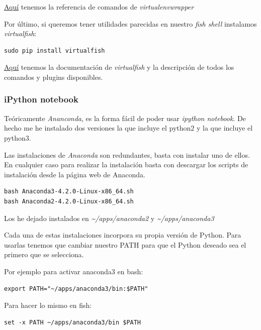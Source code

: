 \documentclass[12pt,spanish,]{scrartcl}
\begin{document}
\href{http://virtualenvwrapper.readthedocs.io/en/latest/command_ref.html}{Aquí}
tenemos la referencia de comandos de \emph{virtualenvwrapper}

Por último, si queremos tener utilidades parecidas en nuestro \emph{fish
shell} instalamos \emph{virtualfish}:

\begin{verbatim}
sudo pip install virtualfish
\end{verbatim}

\href{http://virtualfish.readthedocs.io/en/latest/index.html}{Aquí}
tenemos la documentación de \emph{virtualfish} y la descripción de todos
los comandos y plugins disponibles.

\subsubsection{iPython notebook}\label{ipython-notebook}

Teóricamente \emph{Ananconda}, es la forma fácil de poder usar
\emph{ipython notebook}. De hecho me he instalado dos versiones la que
incluye el python2 y la que incluye el python3.

Las instalaciones de \emph{Anaconda} son redundantes, basta con instalar
uno de ellos. En cualquier caso para realizar la instalación basta con
descargar los scripts de instalación desde la página web de Anaconda.

\begin{verbatim}
bash Anaconda3-4.2.0-Linux-x86_64.sh
bash Anaconda2-4.2.0-Linux-x86_64.sh
\end{verbatim}

Los he dejado instalados en \emph{\textasciitilde{}/apps/anaconda2} y
\emph{\textasciitilde{}/apps/anaconda3}

Cada una de estas instalaciones incorpora su propia versión de Python.
Para usarlas tenemos que cambiar nuestro PATH para que el Python deseado
sea el primero que se selecciona.

Por ejemplo para activar anaconda3 en bash:

\begin{verbatim}
export PATH="~/apps/anaconda3/bin:$PATH"
\end{verbatim}

Para hacer lo mismo en fish:

\begin{verbatim}
set -x PATH ~/apps/anaconda3/bin $PATH
\end{verbatim}
\end{document}
